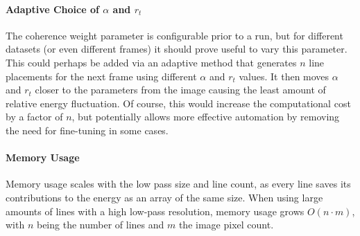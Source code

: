 \paragraph*{Adaptive Choice of $\alpha$ and $r_t$}
The coherence weight parameter is configurable prior to a run,
but for different datasets (or even different frames) it should prove useful to vary this parameter.
This could perhaps be added via an adaptive method
that generates $n$ line placements for the next frame using different $\alpha$ and $r_t$ values.
It then moves $\alpha$ and $r_t$ closer to the parameters
from the image causing the least amount of relative energy fluctuation.
Of course, this would increase the computational cost by a factor of $n$, but potentially
allows more effective automation by removing the need for fine-tuning in some cases.

\paragraph*{Memory Usage}
Memory usage scales with the low pass size and line count,
as every line saves its contributions to the energy as an array of the same size.
When using large amounts of lines with a high low-pass resolution,
memory usage grows $O(n\cdot m)$, with $n$ being the number of lines and $m$ the image pixel count.

